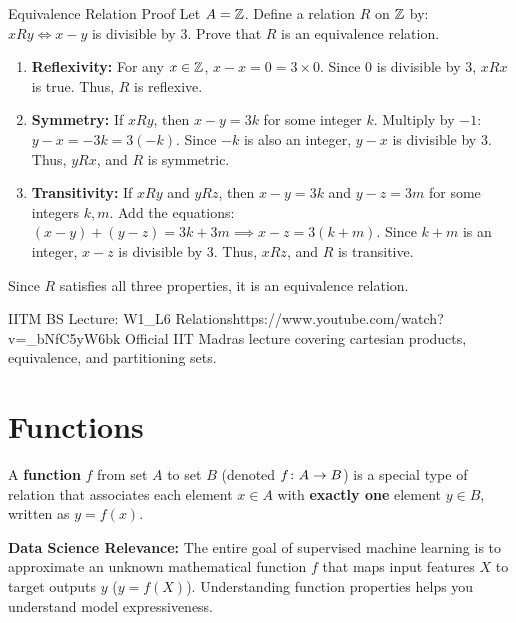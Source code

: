 \begin{examplebox}{Equivalence Relation Proof}
Let $A = \mathbb{Z}$. Define a relation $R$ on $\mathbb{Z}$ by: $x R y \iff x - y$ is divisible by $3$. Prove that $R$ is an equivalence relation.
\begin{enumerate}
    \item \textbf{Reflexivity:} For any $x \in \mathbb{Z}$, $x - x = 0 = 3 \times 0$. Since $0$ is divisible by $3$, $x R x$ is true. Thus, $R$ is reflexive.
    \item \textbf{Symmetry:} If $x R y$, then $x - y = 3k$ for some integer $k$. 
    Multiply by $-1$: $y - x = -3k = 3(-k)$. Since $-k$ is also an integer, $y - x$ is divisible by $3$. Thus, $y R x$, and $R$ is symmetric.
    \item \textbf{Transitivity:} If $x R y$ and $y R z$, then $x - y = 3k$ and $y - z = 3m$ for some integers $k, m$.
    Add the equations: $(x - y) + (y - z) = 3k + 3m \implies x - z = 3(k + m)$.
    Since $k+m$ is an integer, $x - z$ is divisible by $3$. Thus, $x R z$, and $R$ is transitive.
\end{enumerate}
Since $R$ satisfies all three properties, it is an equivalence relation.
\end{examplebox}



\begin{videocard}{IITM BS Lecture: W1\_L6 Relations}{https://www.youtube.com/watch?v=_bNfC5yW6bk}
Official IIT Madras lecture covering cartesian products, equivalence, and partitioning sets.
\end{videocard}

\section{Functions}

A \textbf{function} $f$ from set $A$ to set $B$ (denoted $f \colon A \to B$) is a special type of relation that associates each element $x \in A$ with \textbf{exactly one} element $y \in B$, written as $y = f(x)$. 

\textbf{Data Science Relevance:} The entire goal of supervised machine learning is to approximate an unknown mathematical function $f$ that maps input features $X$ to target outputs $y$ ($y = f(X)$). Understanding function properties helps you understand model expressiveness.

